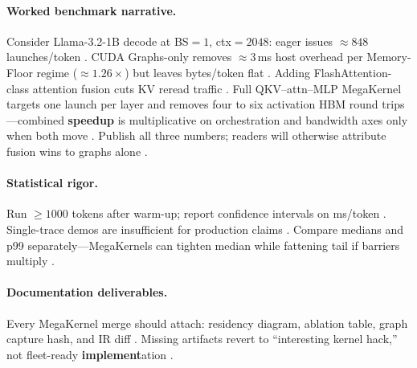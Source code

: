 \paragraph{Worked benchmark narrative.} Consider Llama-3.2-1B decode at BS${=}1$, ctx${=}2048$: eager issues ${\approx}848$ launches/token \citep{taxbreak2026}. CUDA Graphs-only removes ${\approx}3$\,ms host overhead per Memory-Floor regime (${\approx}1.26\times$) but leaves bytes/token flat \citep{memoryfloor2026}. Adding FlashAttention-class attention fusion cuts KV reread traffic \citep{dao2022flashattention}. Full QKV--attn--MLP MegaKernel targets one launch per layer and removes four to six activation HBM round trips---combined \textbf{speedup} is multiplicative on orchestration and bandwidth axes only when both move \citep{taxbreak2026,memoryfloor2026,patel2025llminference}. Publish all three numbers; readers will otherwise attribute fusion wins to graphs alone \citep{nvidia2024cudagraphs,yirage2026}.

\paragraph{Statistical rigor.} Run ${\geq}1000$ tokens after warm-up; report confidence intervals on ms/token \citep{patel2025llminference,memoryfloor2026}. Single-trace demos are insufficient for production claims \citep{taxbreak2026,dao2023flashdecoding}. Compare medians and p99 separately---MegaKernels can tighten median while fattening tail if barriers multiply \citep{kwon2023vllm,semianalysis2024tma}.

\paragraph{Documentation deliverables.} Every MegaKernel merge should attach: residency diagram, ablation table, graph capture hash, and IR diff \citep{yirage2026,chen2020compilerbasedhardw,memoryfloor2026,taxbreak2026}. Missing artifacts revert to ``interesting kernel hack,'' not fleet-ready \textbf{implement}ation \citep{patel2025llminference,liu2024deepseekv3}.

